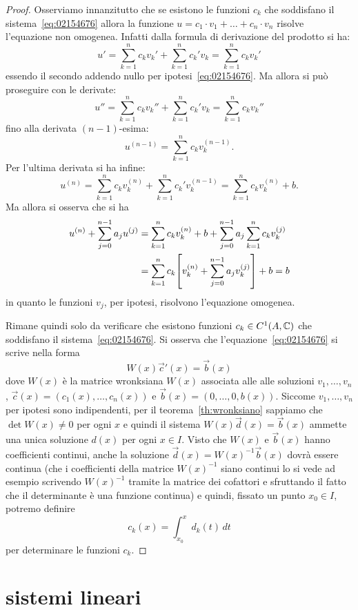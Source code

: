 \begin{proof}
Osserviamo innanzitutto che se esistono le funzioni $c_k$ che
soddisfano il sistema~\eqref{eq:02154676} allora la funzione $u = c_1
\cdot v_1 + \dots + c_n \cdot v_n$ risolve l'equazione non
omogenea. Infatti dalla formula di derivazione del prodotto si ha:
\[
  u' = \sum_{k=1}^n c_k v_k' + \sum_{k=1}^n c_k' v_k
     = \sum_{k=1}^n c_k v_k'
\]
essendo il secondo addendo nullo per ipotesi~\eqref{eq:02154676}.
Ma allora si può proseguire con le derivate:
\[
  u'' = \sum_{k=1}^n c_k v_k'' + \sum_{k=1}^n c_k' v_k
      = \sum_{k=1}^n c_k v_k''
\]
fino alla derivata $(n-1)$-esima:
\[
  u^{(n-1)} = \sum_{k=1}^n c_k v_k^{(n-1)}.
\]
Per l'ultima derivata si ha infine:
\[
  u^{(n)} = \sum_{k=1}^n c_k v_k^{(n)} + \sum_{k=1}^n c_k' v_k^{(n-1)}
          = \sum_{k=1}^n c_k v_k^{(n)} + b.
\]
Ma allora si osserva che si ha
\begin{align*}
 u^{(n)} + \sum_{j=0}^{n-1} a_j u^{(j)}
 &= \sum_{k=1}^n c_k v_k^{(n)} + b + \sum_{j=0}^{n-1} a_j \sum_{k=1}^n c_k v_k^{(j)} \\
 &= \sum_{k=1}^n c_k {\left[ v_k^{(n)} + \sum_{j=0}^{n-1} a_j v_k^{(j)} \right]} + b = b
\end{align*}
 in quanto le funzioni $v_j$, per ipotesi, risolvono l'equazione omogenea.

 Rimane quindi solo da verificare che esistono funzioni $c_k\in
 C^1(A,\mathbb C)$ che soddisfano il sistema~\eqref{eq:02154676}.
 Si osserva che l'equazione~\eqref{eq:02154676} si scrive nella forma
 \[
   W(x) \vec c'(x) = \vec b(x)
 \]
 dove $W(x)$ è la matrice wronksiana $W(x)$ associata alle
 alle soluzioni $v_1, \dots, v_n$, $\vec c(x) = (c_1(x), \dots,
 c_n(x))$ e $\vec b(x) = (0, \dots, 0, b(x))$.
 Siccome $v_1, \dots, v_n$ per ipotesi sono indipendenti,
 per il teorema~\ref{th:wronksiano}
 sappiamo che
 $\det W(x)\neq 0$ per ogni $x$ e quindi il sistema $W(x) \vec d(x) =
 \vec b(x)$
 ammette una unica soluzione $d(x)$ per ogni $x\in I$.
 Visto che $W(x)$ e $\vec b(x)$ hanno coefficienti continui,
 anche la soluzione $\vec d(x) = W(x)^{-1} \vec b(x)$ dovrà essere continua (che i coefficienti della matrice $W(x)^{-1}$ siano continui lo si vede ad esempio scrivendo $W(x)^{-1}$ tramite la matrice dei cofattori e sfruttando il fatto che il determinante è una funzione continua)
 e quindi, fissato un punto $x_0\in I$,
 potremo definire
 \[
   c_k(x) = \int_{x_0}^x d_k(t)\, dt
 \]
 per determinare le funzioni $c_k$.
\end{proof}

\section{sistemi lineari}

